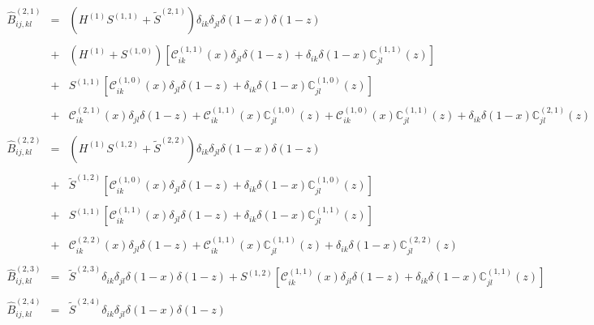 \documentclass[10pt,a4paper]{article}
\begin{document}
\begin{equation}
\begin{array}{rcl}
  \\
  \hat{B}_{ij,kl}^{(2,1)} &=&\displaystyle (H^{(1)}S^{(1,1)}+\widetilde{S}^{(2,1)})
                              \delta_{ik}\delta_{jl}\delta(1-x)\delta(1-z)\\
  \\
                          &+& \displaystyle
                              (H^{(1)}+S^{(1,0)})\left[\mathcal{C}_{ik}^{(1,1)}(x)\delta_{jl}\delta(1-z)
                              +
                              \delta_{ik}\delta(1-x)\mathbb{C}_{jl}^{(1,1)}(z)\right]\\
  \\
                          &+&
                              S^{(1,1)}\left[\mathcal{C}_{ik}^{(1,0)}(x)\delta_{jl}\delta(1-z)
                              +
                              \delta_{ik}\delta(1-x)\mathbb{C}_{jl}^{(1,0)}(z)\right]\\
  \\
                          &+& \mathcal{C}_{ik}^{(2,1)}(x)\delta_{jl}\delta(1-z) + 
                              \mathcal{C}_{ik}^{(1,1)}(x)\mathbb{C}_{jl}^{(1,0)}(z) +\mathcal{C}_{ik}^{(1,0)}(x)\mathbb{C}_{jl}^{(1,1)}(z)
                              +\delta_{ik}\delta(1-x)\mathbb{C}_{jl}^{(2,1)}(z)\\
  \\
  \hat{B}_{ij,kl}^{(2,2)} &=&\displaystyle (H^{(1)}S^{(1,2)}+\widetilde{S}^{(2,2)})
                              \delta_{ik}\delta_{jl}\delta(1-x)\delta(1-z)\\
  \\
                          &+&\displaystyle
                              \widetilde{S}^{(1,2)}\left[\mathcal{C}_{ik}^{(1,0)}(x)\delta_{jl}\delta(1-z)+\delta_{ik}\delta(1-x)\mathbb{C}_{jl}^{(1,0)}(z)\right]\\
  \\
                          &+&\displaystyle
                              S^{(1,1)}\left[\mathcal{C}_{ik}^{(1,1)}(x)\delta_{jl}\delta(1-z)+\delta_{ik}\delta(1-x)\mathbb{C}_{jl}^{(1,1)}(z)\right]\\
  \\
                          &+& \mathcal{C}_{ik}^{(2,2)}(x)\delta_{jl}\delta(1-z) + 
                              \mathcal{C}_{ik}^{(1,1)}(x)\mathbb{C}_{jl}^{(1,1)}(z)
                              +\delta_{ik}\delta(1-x)\mathbb{C}_{jl}^{(2,2)}(z)\\
  \\
  \hat{B}_{ij,kl}^{(2,3)} &=&\displaystyle
                              \widetilde{S}^{(2,3)}\delta_{ik}\delta_{jl}\delta(1-x)\delta(1-z)
                              + S^{(1,2)}\left[\mathcal{C}_{ik}^{(1,1)}(x)\delta_{jl}\delta(1-z)
                              +
                              \delta_{ik}\delta(1-x)\mathbb{C}_{jl}^{(1,1)}(z)\right]
  \\
  \\
  \hat{B}_{ij,kl}^{(2,4)} &=&\displaystyle \widetilde{S}^{(2,4)}\delta_{ik}\delta_{jl}\delta(1-x)\delta(1-z)
\end{array}
\end{equation}
\end{document}
